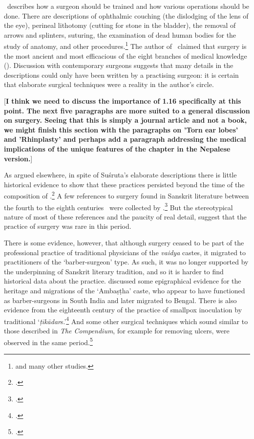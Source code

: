 
\SS\ describes how a surgeon should be trained 
and how
various operations should be done.  There are descriptions of ophthalmic couching
(the dislodging of the lens of the eye), perineal lithotomy (cutting for stone in
the bladder), the removal of arrows and splinters, suturing, the examination of
dead human bodies for the study of anatomy, and other
procedures.\footnote{\cites{mukh-1913,desh-2000,nara-2011,wuja-2003,wils-1823}
 and
many other studies.} The author of \SS\ claimed that 
surgery is
the most ancient and most efficacious of the eight branches of medical knowledge
(). Discussion with contemporary surgeons suggests 
that
many details in the descriptions could only have been written by a practising
surgeon: it is certain that elaborate surgical techniques were a reality in
the author's circle.

[\textbf{I think we need to discuss the importance of 1.16 specifically at this point. The next five paragraphs are more suited to a general discussion on surgery. Seeing that this is simply a journal article and not a book, we might finish this section with the paragraphs on 'Torn ear lobes' and 'Rhinplasty' and perhaps add a paragraph addressing the medical implications of the unique features of the chapter in the Nepalese version.}]

As argued elsewhere, in spite of Suśruta's elaborate descriptions there
is little historical evidence to show that these practices persisted beyond the
time of the composition of \SS.\footcite{wuja-indi} A few
references to surgery found in Sanskrit literature between the fourth to the
eighth centuries \AD\ were collected by
\citeauthor{shar-1972}.\footcite[74--8]{shar-1972}  But the stereotypical nature of
most of these references and the paucity of real detail, suggest that the practice
of surgery was rare in this period.

There is some evidence, however, that although surgery ceased to be part of
the professional practice of traditional physicians of the \emph{vaidya}
castes, it migrated to practitioners of the `barber-surgeon' type.  As such,
it was no longer supported by the underpinning of Sanskrit literary
tradition, and so it is harder to find historical data about the
practice. \citet{sirc-raks} discussed some epigraphical evidence for the
heritage and migrations of the `Ambaṣṭha' caste, who appear to have
functioned as barber-surgeons in South India and later migrated to Bengal.
There is also evidence from the eighteenth century of the practice of
smallpox inoculation by traditional 
`\emph{ṭīkādar}s.'\footcite{holw-acco,coul-acco} And some other surgical 
techniques which sound
similar to those described in \emph{The Compendium}, for example for removing 
ulcers, were
observed in the same period.\footcite[79]{babe-scie}

